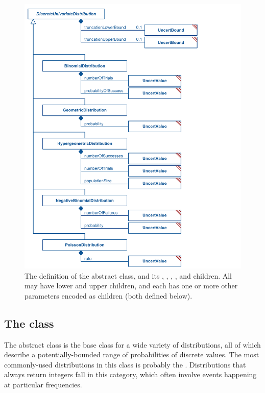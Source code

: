 \begin{figure}[htb]
\includegraphics[width=0.7\linewidth]{figs/discreteUnivariateDistribution.pdf}
\caption{The definition of the \DiscreteUnivariateDistribution abstract class, and its \BinomialDistribution, \GeometricDistribution, \HypergeometricDistribution, \NegativeBinomialDistribution, and \PoissonDistribution children.  All may have lower and upper \UncertBound children, and each has one or more other parameters encoded as \UncertValue children (both defined below).}
\label{fig:discreteUnivariateDistribution}
\end{figure}

\subsection{The  class}
\label{DiscreteUnivariateDistribution-class}
\label{discreteunivariatedistribution-class}

The abstract \DiscreteUnivariateDistribution class is the base class for a wide variety of distributions, all of which describe a potentially-bounded range of probabilities of discrete values.  The most commonly-used distributions in this class is probably the \PoissonDistribution.  Distributions that always return integers fall in this category, which often involve events happening at particular frequencies.

